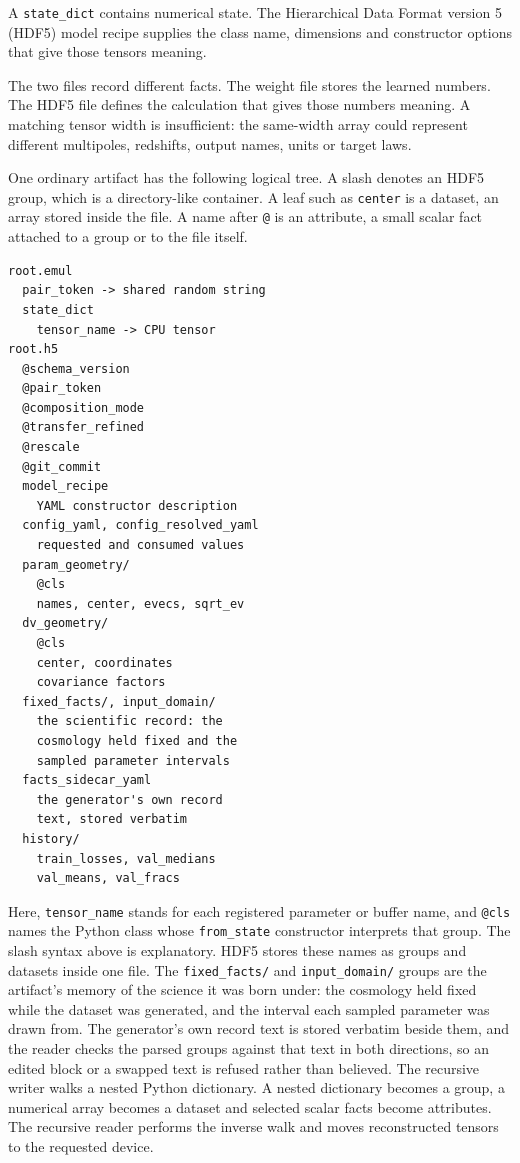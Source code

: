 \documentclass[10pt,aps,prd,twocolumn,nofootinbib]{revtex4-2}
\newcommand{\code}[1]{\texttt{#1}}
\begin{document}
A \code{state\_dict} contains numerical state.  The Hierarchical Data Format
version 5 (HDF5) model recipe supplies the class name, dimensions and
constructor options that give those tensors meaning.

The two files record different facts.  The weight file stores the learned
numbers.  The HDF5 file defines the calculation that gives those numbers
meaning.  A matching tensor width is insufficient: the same-width
array could represent different multipoles, redshifts, output names, units or
target laws.

One ordinary artifact has the following logical tree.  A slash denotes an
HDF5 group, which is a directory-like container.  A leaf such as
\code{center} is a dataset, an array stored inside the file.  A name after
\code{@} is an attribute, a small scalar fact attached to a group or to the
file itself.
\begin{verbatim}
root.emul
  pair_token -> shared random string
  state_dict
    tensor_name -> CPU tensor
root.h5
  @schema_version
  @pair_token
  @composition_mode
  @transfer_refined
  @rescale
  @git_commit
  model_recipe
    YAML constructor description
  config_yaml, config_resolved_yaml
    requested and consumed values
  param_geometry/
    @cls
    names, center, evecs, sqrt_ev
  dv_geometry/
    @cls
    center, coordinates
    covariance factors
  fixed_facts/, input_domain/
    the scientific record: the
    cosmology held fixed and the
    sampled parameter intervals
  facts_sidecar_yaml
    the generator's own record
    text, stored verbatim
  history/
    train_losses, val_medians
    val_means, val_fracs
\end{verbatim}
Here, \code{tensor\_name} stands for each registered parameter or buffer name,
and \code{@cls} names the Python class whose \code{from\_state} constructor
interprets that group.  The slash syntax above is explanatory.  HDF5 stores
these names as groups and datasets inside one file.
The \code{fixed\_facts/} and \code{input\_domain/} groups are the artifact's
memory of the science it was born under: the cosmology held fixed while the
dataset was generated, and the interval each sampled parameter was drawn
from.  The generator's own record text is stored verbatim beside them, and
the reader checks the parsed groups against that text in both directions, so
an edited block or a swapped text is refused rather than believed.
The recursive writer walks a nested Python dictionary.  A nested dictionary
becomes a group, a numerical array becomes a dataset and selected scalar
facts become attributes.  The recursive reader performs the inverse walk and
moves reconstructed tensors to the requested device.
\end{document}
